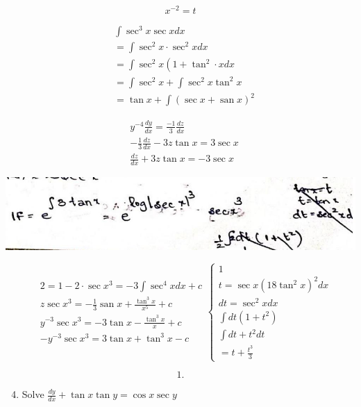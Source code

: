 \documentclass[10pt]{article}
\begin{document}
$$
x^{-2}=t
$$

$$
\begin{aligned}
& \int \sec ^{3} x \sec x d x \\
& =\int \sec ^{2} x \cdot \sec ^{2} x d x \\
& =\int \sec ^{2} x\left(1+\tan ^{2} \cdot x d x\right. \\
& =\int \sec ^{2} x+\int \sec ^{2} x \tan ^{2} x \\
& =\tan x+\int(\sec x+\operatorname{san} x)^{2}
\end{aligned}
$$

$$
\begin{aligned}
& y^{-4} \frac{d y}{d x}=\frac{-1}{3} \frac{d z}{d x} \\
& -\frac{1}{3} \frac{d z}{d x}-3 z \tan x=3 \sec x \\
& \frac{d z}{d x}+3 z \tan x=-3 \sec x
\end{aligned}
$$

\begin{center}
\includegraphics[max width=\textwidth]{2024_06_29_97217e818b79475761ffg-08}
\end{center}

$$
\begin{aligned}
& 2=1-2 \cdot \sec x^{3}=-3 \int \sec ^{4} x d x+c \\
& z \sec x^{3}=-\frac{1}{3} \operatorname{san} x+\frac{\tan ^{3} x}{x^{5}}+c \\
& y^{-3} \sec x^{3}=-3 \tan x-\frac{\tan ^{3} x}{x}+c \\
& -y^{-3} \sec x^{3}=3 \tan x+\tan ^{3} x-c
\end{aligned}\left\{\begin{array}{l}
1 \\
t=\sec x\left(18 \tan ^{2} x\right)^{2} d x \\
d t=\sec ^{2} x d x \\
\int d t\left(1+t^{2}\right) \\
\int d t+t^{2} d t \\
=t+\frac{t^{3}}{3}
\end{array}\right.
$$

$$
1 .
$$

\begin{enumerate}
  \setcounter{enumi}{3}
  \item Solve $\frac{d y}{d x}+\tan x \tan y=\cos x \sec y$
\end{enumerate}
\end{document}
